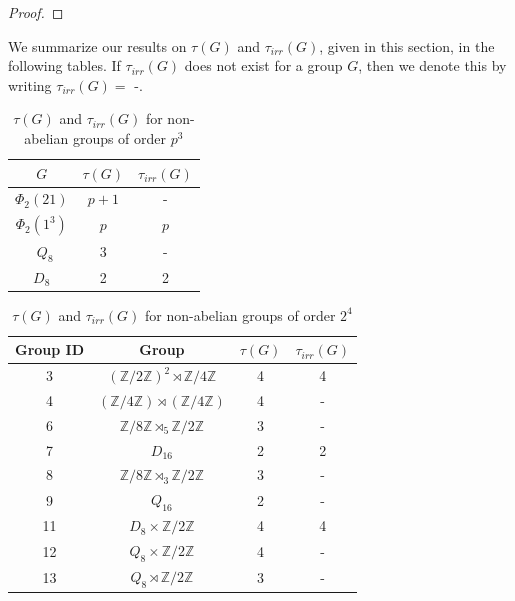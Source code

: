 \documentclass[a4paper,11pt]{amsart}
\numberwithin{equation}{section}
\numberwithin{equation}{subsection}
\begin{document}
\begin{proof}


\end{proof}

We summarize our results on $\tau(G)$ and $\tau_{irr}(G)$, given in this section, in the following tables. If $\tau_{irr}(G)$ does not exist for a group $G$, then we denote this by writing $\tau_{irr}(G)=$ -.

\begin{table}[h!]
\centering
\small
\setlength{\extrarowheight}{2pt}
\begin{tabular}{|c|c|c|}
	\hline
	$G$ & $\tau(G)$ & $\tau_{irr}(G)$ \\ 
	\hline
	$\Phi_2(21)$ & $p+1$ & - \\ 
	$\Phi_2(1^3)$ & $p$ & $p$ \\ \
	$Q_8$ & 3 & - \\ 
	$D_8$ & 2 & 2 \\ 
	\hline
\end{tabular}
\caption{$\tau(G)$ and $\tau_{irr}(G)$ for non-abelian groups of order $p^3$}
\end{table}

\begin{table}[h!]
\centering
\small
\begin{tabular}{|c|c|c|c|}
	\hline
	Group ID & Group & $\tau(G)$ & $\tau_{irr}(G)$ \\
	\hline
	3  & $(\mathbb{Z}/2\mathbb{Z})^{2} \rtimes \mathbb{Z}/4\mathbb{Z}$ & 4 & 4 \\
	4  & $(\mathbb{Z}/4\mathbb{Z}) \rtimes (\mathbb{Z}/4\mathbb{Z})$ & 4 & - \\
	6  & $\mathbb{Z}/8\mathbb{Z} \rtimes_{5} \mathbb{Z}/2\mathbb{Z}$ & 3 & - \\
	7  & $D_{16}$ & 2 & 2 \\
	8  & $\mathbb{Z}/8\mathbb{Z} \rtimes_{3} \mathbb{Z}/2\mathbb{Z}$ & 3 & - \\
	9  & $Q_{16}$ & 2 & - \\
	11 & $D_{8} \times \mathbb{Z}/2\mathbb{Z}$ & 4 & 4 \\
	12 & $Q_{8} \times \mathbb{Z}/2\mathbb{Z}$ & 4 & - \\
	13 & $Q_{8} \rtimes \mathbb{Z}/2\mathbb{Z}$ & 3 & - \\
	\hline
\end{tabular}
\caption{$\tau(G)$ and $\tau_{irr}(G)$ for non-abelian groups of order $2^4$}
\end{table}
\end{document}
